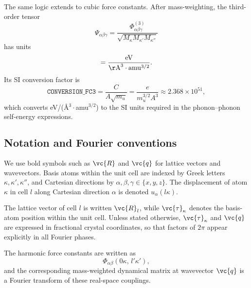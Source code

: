 The same logic extends to cubic force constants.  After mass-weighting,
the third-order tensor
\begin{equation}
  \Psi_{\alpha\beta\gamma}
  = \frac{\Phi^{(3)}_{\alpha\beta\gamma}}
         {\sqrt{M_\kappa M_{\kappa'} M_{\kappa''}}}
\end{equation}
has units
\begin{equation}
  [\Psi] = \frac{\mathrm{eV}}
                 {\mathrm{\AA}^3\cdot\mathrm{amu}^{3/2}}.
\end{equation}
Its SI conversion factor is
\begin{equation}\label{eq:conversion_fc3}
  \texttt{CONVERSION\_FC3}
  = \frac{C}{A\sqrt{m_u}}
  = \frac{e}{m_u^{3/2} A^3}
  \approx 2.368\times10^{51},
\end{equation}
which converts
eV/(\AA$^3\cdot$amu$^{3/2}$) to the SI units required in the
phonon--phonon self-energy expressions.

\subsection{Notation and Fourier conventions}
\label{sec:notation_fourier}

We use bold symbols such as $\vc{R}$ and $\vc{q}$ for lattice vectors
and wavevectors.  Basis atoms within the unit cell are indexed by
Greek letters $\kappa,\kappa',\kappa''$, and Cartesian directions by
$\alpha,\beta,\gamma \in \{x,y,z\}$.  The displacement of atom
$\kappa$ in cell $l$ along Cartesian direction $\alpha$ is denoted
$u_\alpha(l\kappa)$.

The lattice vector of cell $l$ is written $\vc{R}_l$, while
$\vc{\tau}_\kappa$ denotes the basis-atom position within the unit
cell.  Unless stated otherwise, $\vc{\tau}_\kappa$ and $\vc{q}$ are
expressed in fractional crystal coordinates, so that factors of
$2\pi$ appear explicitly in all Fourier phases.

The harmonic force constants are written as
\begin{equation}
  \Phi_{\alpha\beta}(0\kappa,\,l'\kappa'),
\end{equation}
and the corresponding mass-weighted dynamical matrix at wavevector
$\vc{q}$ is a Fourier transform of these real-space couplings.

